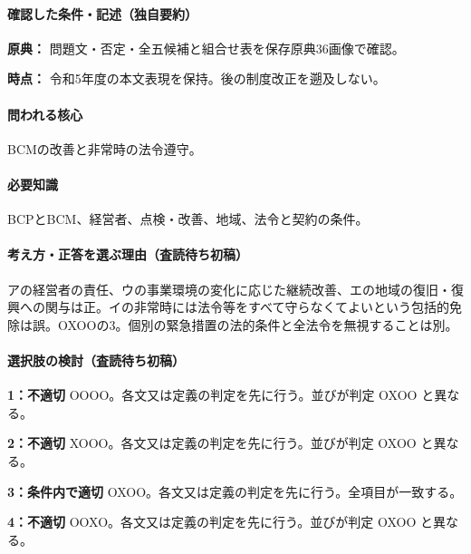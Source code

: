 \paragraph{確認した条件・記述（独自要約）}\mbox{}\par

\noindent\textbf{原典：} 問題文・否定・全五候補と組合せ表を保存原典36画像で確認。\par

\noindent\textbf{時点：} 令和5年度の本文表現を保持。後の制度改正を遡及しない。\par

\paragraph{問われる核心} BCMの改善と非常時の法令遵守。

\paragraph{必要知識} BCPとBCM、経営者、点検・改善、地域、法令と契約の条件。

\paragraph{考え方・正答を選ぶ理由（査読待ち初稿）} アの経営者の責任、ウの事業環境の変化に応じた継続改善、エの地域の復旧・復興への関与は正。イの非常時には法令等をすべて守らなくてよいという包括的免除は誤。OXOOの3。個別の緊急措置の法的条件と全法令を無視することは別。

\paragraph{選択肢の検討（査読待ち初稿）}\mbox{}\par

\noindent\textbf{1：不適切} OOOO。各文又は定義の判定を先に行う。並びが判定 OXOO と異なる。\par

\noindent\textbf{2：不適切} XOOO。各文又は定義の判定を先に行う。並びが判定 OXOO と異なる。\par

\noindent\textbf{3：条件内で適切} OXOO。各文又は定義の判定を先に行う。全項目が一致する。\par

\noindent\textbf{4：不適切} OOXO。各文又は定義の判定を先に行う。並びが判定 OXOO と異なる。\par

